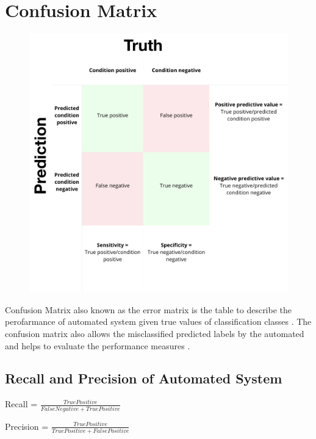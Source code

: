 \section{Confusion Matrix}
\begin{figure}[!htp]
    \includegraphics[width=\textwidth]{Images/cm.png}
\end{figure}
Confusion Matrix also known as the error matrix is the table to describe the 
perofarmance of automated system given true values of classification classes \citep{geekforgeeks}. The 
confusion matrix also allows the misclassified predicted labels by the automated 
and helps to evaluate the performance measures \citep{geekforgeeks}.

\subsection*{Recall and Precision of Automated System}
\begin{center}
    Recall = ${ \frac{True Positive} {False Negative + True Positive}}$
\end{center}

\begin{center}
    Precision = ${ \frac{True Positive} {True Positive + False Positive}}$
\end{center}

